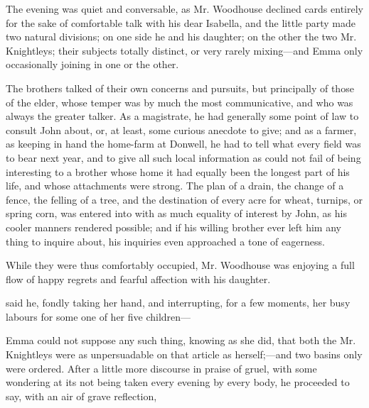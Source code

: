 The evening was quiet and conversable, as Mr. Woodhouse declined cards entirely for the sake of comfortable talk with his dear Isabella, and the little party made two natural divisions; on one side he and his daughter; on the other the two Mr. Knightleys; their subjects totally distinct, or very rarely mixing---and Emma only occasionally joining in one or the other.

The brothers talked of their own concerns and pursuits, but principally of those of the elder, whose temper was by much the most communicative, and who was always the greater talker. As a magistrate, he had generally some point of law to consult John about, or, at least, some curious anecdote to give; and as a farmer, as keeping in hand the home-farm at Donwell, he had to tell what every field was to bear next year, and to give all such local information as could not fail of being interesting to a brother whose home it had equally been the longest part of his life, and whose attachments were strong. The plan of a drain, the change of a fence, the felling of a tree, and the destination of every acre for wheat, turnips, or spring corn, was entered into with as much equality of interest by John, as his cooler manners rendered possible; and if his willing brother ever left him any thing to inquire about, his inquiries even approached a tone of eagerness.

While they were thus comfortably occupied, Mr. Woodhouse was enjoying a full flow of happy regrets and fearful affection with his daughter.

 said he, fondly taking her hand, and interrupting, for a few moments, her busy labours for some one of her five children---

Emma could not suppose any such thing, knowing as she did, that both the Mr. Knightleys were as unpersuadable on that article as herself;---and two basins only were ordered. After a little more discourse in praise of gruel, with some wondering at its not being taken every evening by every body, he proceeded to say, with an air of grave reflection,


